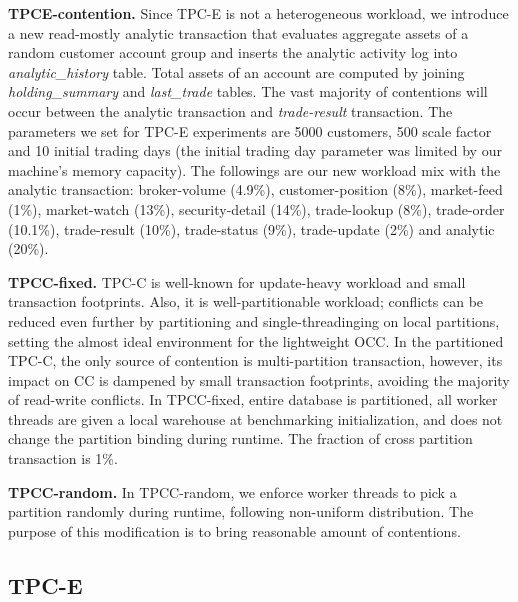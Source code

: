 \textbf{TPCE-contention.}
Since TPC-E is not a heterogeneous workload, we introduce a new read-mostly analytic transaction that evaluates aggregate assets of a random customer account group and inserts the analytic activity log into \textit{analytic\_history} table. Total assets of an account are computed by joining \textit{holding\_summary} and \textit{last\_trade} tables. The vast majority of contentions will occur between the analytic transaction and \textit{trade-result} transaction. The parameters we set for TPC-E experiments are 5000 customers, 500 scale factor and 10 initial trading days (the initial trading day parameter was limited by our machine's memory capacity). The followings are our new workload mix with the analytic transaction: broker-volume (4.9\%), customer-position (8\%), market-feed (1\%), market-watch (13\%), security-detail (14\%), trade-lookup (8\%), trade-order (10.1\%), trade-result (10\%), trade-status (9\%), trade-update (2\%) and analytic (20\%). 


\textbf{TPCC-fixed.}
TPC-C is well-known for update-heavy workload and small transaction footprints. Also, it is well-partitionable workload; conflicts can be reduced even further by partitioning and single-threadinging on local partitions, setting the almost ideal environment for the lightweight OCC. In the partitioned TPC-C, the only source of contention is multi-partition transaction, however, its impact on CC is dampened by small transaction footprints, avoiding the majority of read-write conflicts. In TPCC-fixed, entire database is partitioned, all worker threads are given a local warehouse at benchmarking initialization, and does not change the partition binding during runtime. The fraction of cross partition transaction is 1\%. 


\textbf{TPCC-random.}
In TPCC-random, we enforce worker threads to pick a partition randomly during runtime, following non-uniform distribution. The purpose of this modification is to bring reasonable amount of contentions.  

\subsection{TPC-E}


